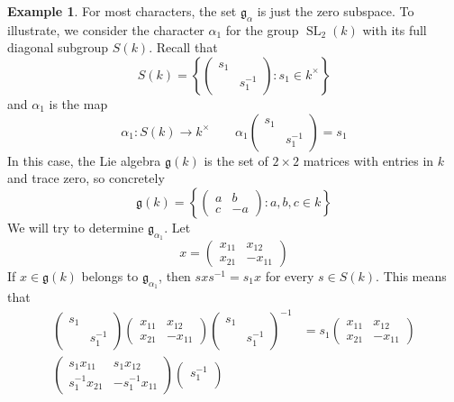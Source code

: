 \documentclass[12pt]{article}
\theoremstyle{definition}
\newtheorem{example}[theorem]{Example}
\newcommand{\lb}{\left\{}
\newcommand{\rb}{\right\}}
\newcommand{\inv}{^{-1}}
\newcommand{\frakg}{\mathfrak{g}}
\DeclareMathOperator{\SL}{SL}
\begin{document}
\begin{example}
\label{alpha one}
For most characters, the set $\frakg_\alpha$ is just the zero subspace. To illustrate, we consider the character $\alpha_1$ for the group $\SL_2(k)$ with its full diagonal subgroup $S(k)$. Recall that
\[
	S(k) =
	\lb
		\begin{pmatrix}
			s_1 \\
			& s_1 \inv
		\end{pmatrix}
		: s_1 \in k^\times
	\rb
\]
and $\alpha_1$ is the map
\[
	\alpha_1:S(k) \to k^\times \qquad \alpha_1
		\begin{pmatrix}
			s_1 \\
			& s_1 \inv
		\end{pmatrix}
		= s_1
\]
In this case, the Lie algebra $\frakg(k)$ is the set of $2 \times 2$ matrices with entries in $k$ and trace zero, so concretely
\[
	\frakg(k) =
	\lb
	\begin{pmatrix}
		a & b \\
		c & -a
	\end{pmatrix}
	: a,b,c \in k
	\rb
\]
We will try to determine $\frakg_{\alpha_1}$. Let
\[
	x = 
	\begin{pmatrix}
		x_{11} & x_{12} \\
		x_{21} & -x_{11}
	\end{pmatrix}
\]
If $x \in \frakg(k)$ belongs to $\frakg_{\alpha_1}$, then $sxs \inv = s_1 x$ for every $s \in S(k)$. This means that
\begin{align*}
	\begin{pmatrix}
		s_1 \\
		& s_1 \inv
	\end{pmatrix}
	\begin{pmatrix}
		x_{11} & x_{12} \\
		x_{21} & -x_{11}
	\end{pmatrix}
	\begin{pmatrix}
		s_1 \\
		& s_1 \inv
	\end{pmatrix}
	\inv
	&= s_1
	\begin{pmatrix}
		x_{11} & x_{12} \\
		x_{21} & -x_{11}
	\end{pmatrix} \\
	\begin{pmatrix}
		s_1 x_{11} & s_1 x_{12} \\
		s_1 \inv x_{21} & - s_1 \inv x_{11}
	\end{pmatrix}
	\begin{pmatrix}
		s_1 \inv \\

\end{pmatrix}
\end{align*}
\end{example}
\end{document}
